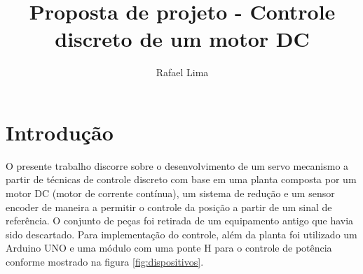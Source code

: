 \documentclass[a4paper,11pt]{article}
\title{Proposta de projeto - Controle discreto de um motor DC} %
\author{Rafael Lima}
\begin{document}

\section{Introdução}

O presente trabalho discorre sobre o desenvolvimento de um servo mecanismo a partir de técnicas de controle discreto com base em uma planta composta por um motor DC (motor de corrente contínua), um sistema de redução e um sensor encoder de maneira a permitir o controle da posição a partir de um sinal de referência. O conjunto de peças foi retirada de um equipamento antigo que havia sido descartado. Para implementação do controle, além da planta foi utilizado um Arduino UNO e uma módulo com uma ponte H para o controle de potência conforme mostrado na figura \ref{fig:dispositivos}.
\end{document}
